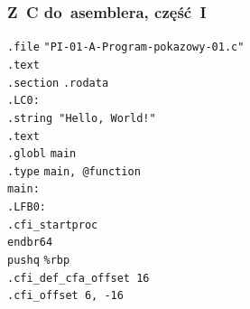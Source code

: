 \documentclass[10pt,t]{beamer}
\begin{document}
\begin{frame}
  \frametitle{Z~C do~asemblera, część~I}


  \hphantom{aaaaa} \texttt{.file} \hphantom{aaa}
  \texttt{"PI-01-A-Program-pokazowy-01.c"} \\
  \hphantom{aaaaa} \texttt{.text} \\
  \hphantom{aaaaa} \texttt{.section} \hphantom{aaaaaa} \texttt{.rodata} \\
  \texttt{.LC0:} \\
  \hphantom{aaaaa} \texttt{.string "Hello, World!"} \\
  \hphantom{aaaaa} \texttt{.text} \\
  \hphantom{aaaaa} \texttt{.globl} \hphantom{aa} \texttt{main} \\
  \hphantom{aaaaa} \texttt{.type} \hphantom{aaa}
  \texttt{main, @function} \\
  \texttt{main:} \\
  \texttt{.LFB0:} \\
  \hphantom{aaaaa} \texttt{.cfi\_startproc} \\
  \hphantom{aaaaa} \texttt{endbr64} \\
  \hphantom{aaaaa} \texttt{pushq} \hphantom{aaa} \texttt{\%rbp} \\
  \hphantom{aaaaa} \texttt{.cfi\_def\_cfa\_offset 16} \\
  \hphantom{aaaaa} \texttt{.cfi\_offset 6, -16} \\

\end{frame}
\end{document}
